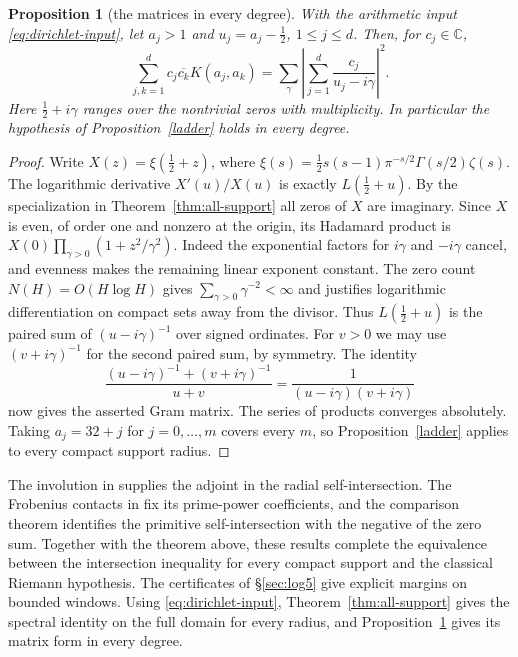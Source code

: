 \documentclass[11pt]{amsart}
\newtheorem{proposition}[theorem]{Proposition}
\theoremstyle{definition}
\theoremstyle{remark}
\begin{document}
\begin{proposition}[the matrices in every degree]\label{prop:all-degree-gram}
With the arithmetic input \eqref{eq:dirichlet-input}, let $a_j>1$
and $u_j=a_j-\tfrac12$, $1\le j\le d$. Then, for $c_j\in\mathbb C$,
\[
 \sum_{j,k=1}^d c_j\overline{c_k}K(a_j,a_k)
 =\sum_{\gamma}\left|\sum_{j=1}^d\frac{c_j}{u_j-i\gamma}\right|^2 .
\]
Here $\tfrac12+i\gamma$ ranges over the nontrivial zeros with multiplicity.
In particular the hypothesis of Proposition~\ref{ladder} holds in every degree.
\end{proposition}
\begin{proof}
Write $X(z)=\xi(\tfrac12+z)$, where
$\xi(s)=\tfrac12 s(s-1)\pi^{-s/2}\Gamma(s/2)\zeta(s)$.
The logarithmic derivative $X'(u)/X(u)$ is exactly $L(\tfrac12+u)$.
By the specialization in Theorem~\ref{thm:all-support} all zeros of $X$ are imaginary.
Since $X$ is even, of order one and nonzero at the origin, its Hadamard
product is $X(0)\prod_{\gamma>0}(1+z^2/\gamma^2)$.
Indeed the exponential factors for $i\gamma$ and $-i\gamma$ cancel,
and evenness makes the remaining linear exponent constant. The zero count
$N(H)=O(H\log H)$ gives $\sum_{\gamma>0}\gamma^{-2}<\infty$ and justifies
logarithmic differentiation on compact sets away from the divisor.
Thus $L(\tfrac12+u)$ is the paired sum of $(u-i\gamma)^{-1}$ over signed
ordinates. For $v>0$ we may use $(v+i\gamma)^{-1}$ for the second paired
sum, by symmetry. The identity
\[
 \frac{(u-i\gamma)^{-1}+(v+i\gamma)^{-1}}{u+v}
 =\frac1{(u-i\gamma)(v+i\gamma)}
\]
now gives the asserted Gram matrix. The series of products converges
absolutely. Taking $a_j=32+j$ for $j=0,\ldots,m$ covers every $m$, so
Proposition~\ref{ladder} applies to every compact support radius.
\end{proof}

The involution in \cite{P43} supplies the adjoint in the radial
self-intersection. The Frobenius contacts in \cite{P44} fix its prime-power
coefficients, and the comparison theorem \cite[Theorem~C]{Paper45} identifies
the primitive self-intersection with the negative of the zero sum.
Together with the theorem above, these results complete the equivalence
between the intersection inequality for every compact support and the
classical Riemann hypothesis. The certificates of \S\ref{sec:log5} give explicit margins on
bounded windows. Using \eqref{eq:dirichlet-input},
Theorem~\ref{thm:all-support} gives the spectral identity on the full
domain for every radius, and Proposition~\ref{prop:all-degree-gram}
gives its matrix form in every degree.
\end{document}
